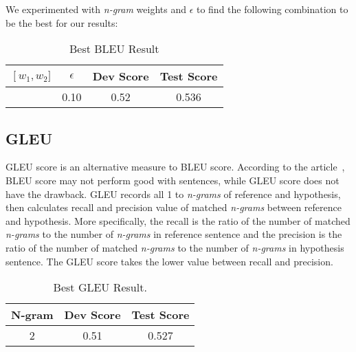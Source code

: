 \documentclass[11pt]{article}
\begin{document}
We experimented with \emph{n-gram} weights and $\epsilon$ to find the following combination to be the best for our results:
\begin{table}[h]
\begin{center}
 \begin{tabular}{|c|c|c|c|} 
 \hline
 $\left[w_{1}, w_{2}]\right.$ & $\epsilon$ &{\bf Dev Score} & {\bf Test Score }\\ [0.5ex]
\hline
[0.92, 0.08] & 0.10 & 0.52 & 0.536  \\
\hline
\end{tabular}
\end{center}
\caption{\label{tab:bleu} Best BLEU Result }
\end{table}

\subsection{GLEU}
GLEU score is an alternative measure to BLEU score. According to the article~\cite{WUS:16}, BLEU score may not perform good with sentences, while GLEU score does not have the drawback. 
GLEU records all 1 to \emph{n-grams} of reference and hypothesis, then calculates recall and precision value of matched \emph{n-grams} between reference and hypothesis. More specifically, the recall is the ratio of the number of matched \emph{n-grams} to the number of \emph{n-grams} in reference sentence and the precision is the ratio of the number of matched \emph{n-grams} to the number of \emph{n-grams} in hypothesis sentence. The GLEU score takes the lower value between recall and precision.
\begin{table}[h]
\begin{center}
 \begin{tabular}{|c|c|c|} 
 \hline
{N-gram} &{\bf Dev Score} & {\bf Test Score }\\ [0.5ex]
\hline
2 & 0.51 & 0.527  \\
\hline
\end{tabular}
\end{center}
\caption{\label{tab:gleu} Best GLEU Result. }
\end{table}
\end{document}
